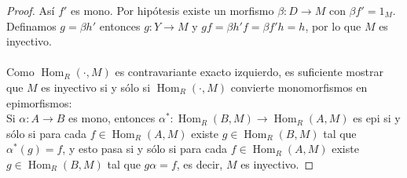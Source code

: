 \documentclass{article}
\begin{document}
\begin{enumerate}[label=\textbf{Ej \arabic*.}]
\begin{proof}
Así $f'$ es mono. Por hipótesis existe un morfismo $\beta\colon D\longrightarrow M$ con $\beta f'=1_M$. Definamos $g=\beta  h'$ entonces 
$g\colon Y\longrightarrow M$ y $gf=\beta  h'f=\beta f'h=h$, por lo que $M$ es inyectivo.\\
\\
Como $\operatorname{Hom}_R(\cdot,M)$ es contravariante exacto izquierdo, es suficiente mostrar que $M$ es inyectivo si y sólo si
$\operatorname{Hom}_R(\cdot,M)$ convierte monomorfismos en epimorfismos:\\
Si $\alpha\colon A\longrightarrow B$ es mono, entonces $\alpha^*\colon\operatorname{Hom}_R(B,M)\longrightarrow \operatorname{Hom}_R(A,M)$
es epi si y sólo si para cada $f\in \operatorname{Hom}_R(A,M)$ existe $g\in \operatorname{Hom}_R(B,M)$ tal que $\alpha^*(g)=f$, y esto pasa si y sólo si para cada $f\in \operatorname{Hom}_R(A,M)$
 existe $g\in \operatorname{Hom}_R(B,M)$ tal que $g\alpha=f$, es decir, $M$ es inyectivo.
\end{proof}






\end{enumerate}
\end{document}
